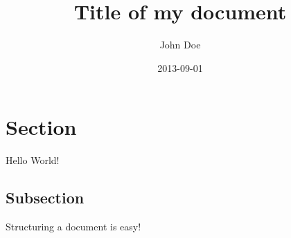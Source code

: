 \documentclass{article}
\title{Title of my document}
\date{2013-09-01}
\author{John Doe}
\begin{document}
\maketitle
{}
\newpage
{}

\section{Section}

Hello World!

\subsection{Subsection}

Structuring a document is easy!
\end{document}
